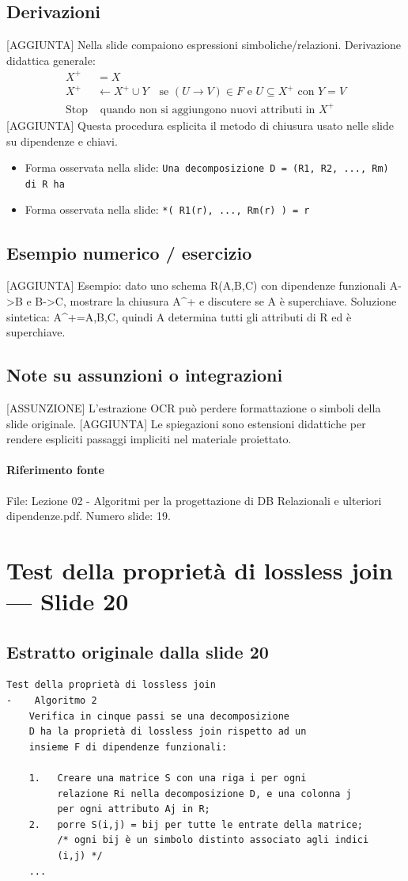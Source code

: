 \documentclass[11pt]{article}
\begin{document}
\subsection*{Derivazioni}
[AGGIUNTA] Nella slide compaiono espressioni simboliche/relazioni. Derivazione didattica generale:
\begin{align*}
X^+ &= X \\
X^+ &\leftarrow X^+ \cup Y \quad \text{se } (U \to V) \in F \text{ e } U \subseteq X^+ \text{ con } Y=V \\
\text{Stop} &\text{ quando non si aggiungono nuovi attributi in } X^+
\end{align*}
[AGGIUNTA] Questa procedura esplicita il metodo di chiusura usato nelle slide su dipendenze e chiavi.
\begin{itemize}[leftmargin=*]
\item Forma osservata nella slide: \texttt{Una decomposizione D = (R1, R2, ..., Rm) di R ha}
\item Forma osservata nella slide: \texttt{*(  R1(r), ...,   Rm(r) ) = r}
\end{itemize}
\subsection*{Esempio numerico / esercizio}
[AGGIUNTA] Esempio: dato uno schema R(A,B,C) con dipendenze funzionali A->B e B->C, mostrare la chiusura A^+ e discutere se A è superchiave. Soluzione sintetica: A^+={A,B,C}, quindi A determina tutti gli attributi di R ed è superchiave.
\subsection*{Note su assunzioni o integrazioni}
[ASSUNZIONE] L'estrazione OCR può perdere formattazione o simboli della slide originale.
[AGGIUNTA] Le spiegazioni sono estensioni didattiche per rendere espliciti passaggi impliciti nel materiale proiettato.
\paragraph{Riferimento fonte} File: Lezione 02 - Algoritmi per la progettazione di DB Relazionali e ulteriori dipendenze.pdf. Numero slide: 19.
\section{Test della proprietà di lossless join --- Slide 20}
\subsection*{Estratto originale dalla slide 20}
\begin{lstlisting}
Test della proprietà di lossless join
-    Algoritmo 2
    Verifica in cinque passi se una decomposizione
    D ha la proprietà di lossless join rispetto ad un
    insieme F di dipendenze funzionali:

    1.   Creare una matrice S con una riga i per ogni
         relazione Ri nella decomposizione D, e una colonna j
         per ogni attributo Aj in R;
    2.   porre S(i,j) = bij per tutte le entrate della matrice;
         /* ogni bij è un simbolo distinto associato agli indici
         (i,j) */
    ...
\end{lstlisting}
\end{document}
